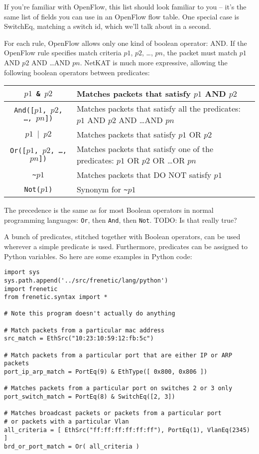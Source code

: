 \bigskip
If you're familiar with OpenFlow, this list should look familiar to you -- it's the same list of fields you can 
use in an OpenFlow flow table.
One special case is SwitchEq, matching a switch id, which we'll talk about in a second.  

For each rule, OpenFlow allows only one kind of boolean operator: AND.  
If the OpenFlow rule specifies match criteria $p1$, $p2$, \ldots, $pn$, the packet must match $p1$ AND $p2$
AND \ldots AND $pn$.  
NetKAT is much more expressive, allowing the following boolean operators between predicates:

\bigskip
\begin{tabularx}{6in}{|c|X|}
\hline\hline
\texttt{$p1$ \& $p2$} & Matches packets that satisfy $p1$ AND $p2$
\\ \hline  
\texttt{And([$p1$, $p2$, \ldots, $pn$])} & 
Matches packets that satisfy all the predicates: $p1$ AND $p2$ AND \ldots AND $pn$
\\ \hline  
\texttt{$p1$ $\vert$ $p2$} & Matches packets that satisfy $p1$ OR $p2$
\\ \hline  
\texttt{Or([$p1$, $p2$, \ldots, $pn$])} & 
Matches packets that satisfy one of the predicates: $p1$ OR $p2$ OR \ldots OR $pn$
\\ \hline  
\texttt{\textasciitilde $p1$} & Matches packets that DO NOT satisfy $p1$
\\ \hline  
\texttt{Not($p1$)} & Synonym for \texttt{\textasciitilde $p1$}
\\ \hline\hline
\end{tabularx}

\bigskip

The precedence is the same as for most Boolean operators in normal programming languages: 
\lstinline{Or}, then \lstinline{And}, then \lstinline{Not}.  
TODO: Is that really true?

A bunch of predicates, stitched together with Boolean operators, can be used wherever a simple predicate is used.
Furthermore, predicates can be assigned to Python variables.
So here are some examples in Python code:

\begin{lstlisting}
import sys
sys.path.append('../src/frenetic/lang/python')
import frenetic
from frenetic.syntax import *

# Note this program doesn't actually do anything

# Match packets from a particular mac address
src_match = EthSrc("10:23:10:59:12:fb:5c")

# Match packets from a particular port that are either IP or ARP packets
port_ip_arp_match = PortEq(9) & EthType([ 0x800, 0x806 ])

# Matches packets from a particular port on switches 2 or 3 only
port_switch_match = PortEq(8) & SwitchEq([2, 3])

# Matches broadcast packets or packets from a particular port 
# or packets with a particular Vlan
all_criteria = [ EthSrc("ff:ff:ff:ff:ff:ff"), PortEq(1), VlanEq(2345) ] 
brd_or_port_match = Or( all_criteria ) 

\end{lstlisting}

